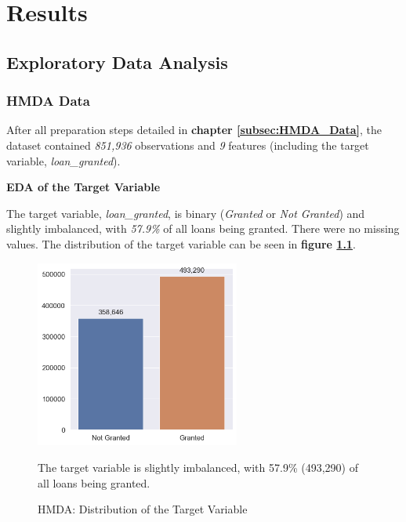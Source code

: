 \chapter{Results}\label{chap:Results}

\section{Exploratory Data Analysis}\label{sec:Exploratory_Data_Analysis}

\subsection{HMDA Data}\label{subsec:HMDA_EDA}

After all preparation steps detailed in \textbf{chapter \ref{subsec:HMDA_Data}}, the dataset contained \textit{851,936} observations and \textit{9} features (including the target variable, \textit{loan\_granted}). 

\textbf{EDA of the Target Variable}

The target variable, \textit{loan\_granted}, is binary (\textit{Granted} or \textit{Not Granted}) and slightly imbalanced, with \textit{57.9\%} of all loans being granted. 
There were no missing values. The distribution of the target variable can be seen in \textbf{figure \ref{fig:CHXX_Target_Variable_Distribution}}.

\begin{figure}[!htbp]
    \centering
    \includegraphics[width=0.6\textwidth]{images/CHXX_Target_Variable_Distribution.png}
    \caption{HMDA: Distribution of the Target Variable}
    \medskip
    \small
    The target variable is slightly imbalanced, with 57.9\% (493,290) of all loans being granted.
    \label{fig:CHXX_Target_Variable_Distribution}
\end{figure}

